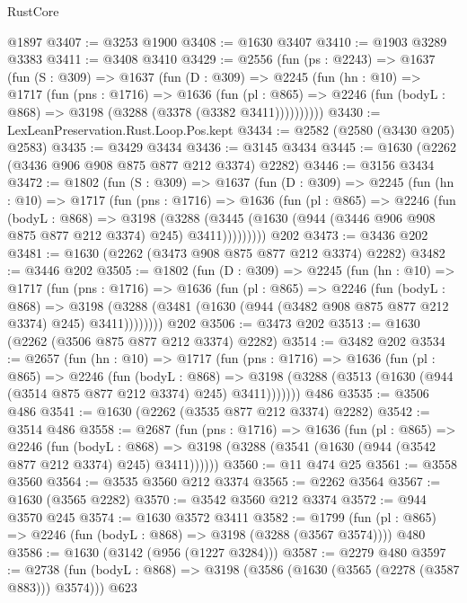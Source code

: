 \begin{lexlean}{RustCore}
\begin{coremodule}
    @1897
@3407 := @3253 @1900
@3408 := @1630 @3407
@3410 := @1903 @3289 @3383
@3411 := @3408 @3410
@3429 := @2556
    (fun (ps : @2243) =>
    @1637
      (fun (S : @309) =>
      @1637
        (fun (D : @309) =>
        @2245
          (fun (hn : @10) =>
          @1717
            (fun (pns : @1716) =>
            @1636
              (fun (pl : @865) =>
              @2246 (fun (bodyL : @868) => @3198 (@3288 (@3378 (@3382 @3411))))))))))
@3430 := LexLeanPreservation.Rust.Loop.Pos.kept
@3434 := @2582 (@2580 (@3430 @205) @2583)
@3435 := @3429 @3434
@3436 := @3145 @3434
@3445 := @1630 (@2262 (@3436 @906 @908 @875 @877 @212 @3374) @2282)
@3446 := @3156 @3434
@3472 := @1802
    (fun (S : @309) =>
    @1637
      (fun (D : @309) =>
      @2245
        (fun (hn : @10) =>
        @1717
          (fun (pns : @1716) =>
          @1636
            (fun (pl : @865) =>
            @2246
              (fun (bodyL : @868) =>
              @3198
                (@3288
                  (@3445 (@1630 (@944 (@3446 @906 @908 @875 @877 @212 @3374) @245) @3411)))))))))
    @202
@3473 := @3436 @202
@3481 := @1630 (@2262 (@3473 @908 @875 @877 @212 @3374) @2282)
@3482 := @3446 @202
@3505 := @1802
    (fun (D : @309) =>
    @2245
      (fun (hn : @10) =>
      @1717
        (fun (pns : @1716) =>
        @1636
          (fun (pl : @865) =>
          @2246
            (fun (bodyL : @868) =>
            @3198 (@3288 (@3481 (@1630 (@944 (@3482 @908 @875 @877 @212 @3374) @245) @3411))))))))
    @202
@3506 := @3473 @202
@3513 := @1630 (@2262 (@3506 @875 @877 @212 @3374) @2282)
@3514 := @3482 @202
@3534 := @2657
    (fun (hn : @10) =>
    @1717
      (fun (pns : @1716) =>
      @1636
        (fun (pl : @865) =>
        @2246
          (fun (bodyL : @868) =>
          @3198 (@3288 (@3513 (@1630 (@944 (@3514 @875 @877 @212 @3374) @245) @3411)))))))
    @486
@3535 := @3506 @486
@3541 := @1630 (@2262 (@3535 @877 @212 @3374) @2282)
@3542 := @3514 @486
@3558 := @2687
    (fun (pns : @1716) =>
    @1636
      (fun (pl : @865) =>
      @2246
        (fun (bodyL : @868) =>
        @3198 (@3288 (@3541 (@1630 (@944 (@3542 @877 @212 @3374) @245) @3411))))))
@3560 := @11 @474 @25
@3561 := @3558 @3560
@3564 := @3535 @3560 @212 @3374
@3565 := @2262 @3564
@3567 := @1630 (@3565 @2282)
@3570 := @3542 @3560 @212 @3374
@3572 := @944 @3570 @245
@3574 := @1630 @3572 @3411
@3582 := @1799 (fun (pl : @865) => @2246 (fun (bodyL : @868) => @3198 (@3288 (@3567 @3574)))) @480
@3586 := @1630 (@3142 (@956 (@1227 @3284)))
@3587 := @2279 @480
@3597 := @2738 (fun (bodyL : @868) => @3198 (@3586 (@1630 (@3565 (@2278 (@3587 @883))) @3574))) @623

\end{coremodule}
\end{lexlean}
